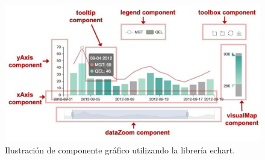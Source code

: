 \begin{figure}[htpb]
	\centering
	\includegraphics[scale=.60]{./Figures/echart-grafica.png}
	\caption[Componente gráfico de echarts]{Ilustración de componente gráfico utilizando la librería echart\protect\footnotemark.}
	\label{fig:echart-grafica}
\end{figure}





